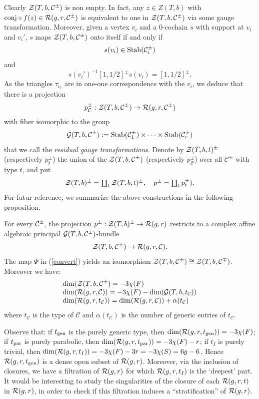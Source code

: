 Clearly ${\mathcal Z}(T,b,\mathcal{C}^\pm)$ is non empty. In fact, any
$z\in Z(T,b)$ with ${\rm conj} \circ f(z) \in
{\mathcal R}(g,r,\mathcal{C}^\pm)$ is equivalent to one in
${\mathcal Z}(T,b,\mathcal{C}^\pm)$ via some gauge transformation.
Moreover, given a vertex $v_i$ and a $0$-cochain $s$ with support
at $v_i$ and $v_i'$, $s$ maps ${\mathcal Z}(T,b,\mathcal{C}^\pm)$ onto
itself if and only if $$s(v_i)\in {\rm Stab}(\mathcal{C}^\pm_i)$$
and $$s(v_i')^{-1}[1,1/2]^\pm s(v_i) = [1,1/2]^\pm. $$ As the
triangles $\tau_{v_i}$ are in one-one correspondence with the
$v_i$, we deduce that there is a projection
\begin{equation}\label{projc}
p^\pm_{\mathcal{C}}: {\mathcal Z}(T,b,\mathcal{C}^\pm)\to
{\mathcal R}(g,r,\mathcal{C}^\pm) \end{equation} with fiber isomorphic to
the group $${\mathcal G} (T,b,\mathcal{C}^\pm):={\rm
Stab}(\mathcal{C}^\pm_1)\times \dots \times {\rm
Stab}(\mathcal{C}^\pm_r)$$ that we call the {\it residual gauge
transformations}.  Denote by ${\mathcal Z}(T,b,t)^\pm$ (respectively
$p^\pm_t$) the union of the ${\mathcal Z}(T,b,\mathcal{C}^\pm)$
(respectively $p^\pm _{\mathcal{C}}$) over all $\mathcal{C}^\pm$
with type $t$, and put $$\textstyle {\mathcal Z}(T,b)^\pm = \coprod_t
{\mathcal Z}(T,b,t)^\pm, \quad p^\pm =  \coprod_t p^\pm_t).$$ For futur
reference, we summarize the above constructions in the following
proposition.
\begin{prop}\label{topcomp} For every ${\mathcal C}^\pm$, the projection
  $p^\pm : {\mathcal Z}(T,b)^\pm \rightarrow {\mathcal R}(g,r)$ restricts
to a complex affine algebraic principal ${\mathcal G}
(T,b,\mathcal{C}^\pm)$-bundle $${\mathcal Z}(T,b,\mathcal{C}^\pm) \to
{\mathcal R}(g,r,\mathcal{C}).$$ The map $\Psi$ in (\ref{convert}) yields
an isomorphism ${\mathcal Z}(T,b,\mathcal{C}^\pm) \cong
{\mathcal Z}(T,b,\mathcal{C}^\mp)$. Moreover we have: $$\begin{array}{lll}
{\rm dim}({\mathcal Z}(T,b,\mathcal{C}^\pm)= -3\chi(F)\\ {\rm
dim}({\mathcal R}(g,r,\mathcal{C})) = -3\chi(F) - {\rm dim}({\mathcal G}
(T,b,t_{\mathcal{C}}))\\ {\rm dim}({\mathcal R}(g,r,t_{\mathcal{C}})) =
{\rm dim}({\mathcal R}(g,r,\mathcal{C})) + \alpha(t_{\mathcal{C}})
\end{array}$$
where $t_{\mathcal{C}}$ is the type of $\mathcal{C}$ and
$\alpha(t_{\mathcal{C}})$ is the number of
generic entries of $t_{\mathcal{C}}$.
\end{prop}
Observe that: if $t_{{\rm gen}}$ is the purely generic type, then
${\rm dim}({\mathcal R}(g,r,t_{{\rm gen}}))= -3\chi(F)$; if $t_{{\rm par}}$ is
purely parabolic, then ${\rm dim}({\mathcal R}(g,r,t_{{\rm par}}))= -3\chi(F)-
r$; if $t_I$ is purely trivial, then ${\rm dim}({\mathcal R}(g,r,t_I))=
-3\chi(F) -3r = -3\chi(S)= 6g-6$. Hence ${\mathcal R}(g,r,t_{{\rm gen}})$ is a
dense open subset of ${\mathcal R}(g,r)$. Moreover, via the inclusion of
closures, we have a filtration of ${\mathcal R}(g,r)$ for which ${\mathcal R}(g,r,t_I)$
is the `deepest' part. It would be interesting to study the
singularities of the closure of each ${\mathcal R}(g,r,t)$ in ${\mathcal R}(g,r)$, in
order to check if this filtration induces a ``stratification'' of
${\mathcal R}(g,r)$.


